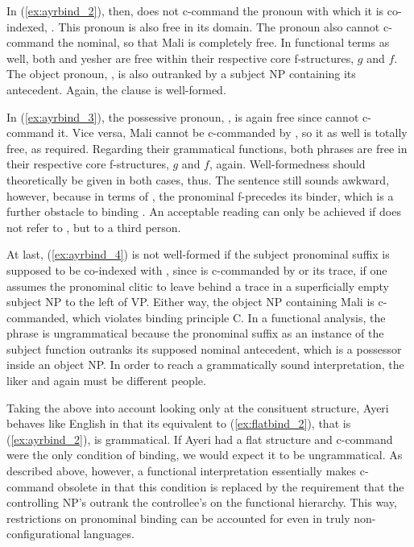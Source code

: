 In (\ref{ex:ayrbind_2}), then,  does not c-command the pronoun
with which it is co-indexed, . This pronoun is also free
in its domain. The pronoun also cannot c-command the nominal, so that
 {Mali} is completely free. In functional terms as well, both
 and  {yes}{her} are free within their respective
core f-structures, $g$ and $f$. The object pronoun, , is
also outranked by a subject NP containing its antecedent. Again, the clause is
well-formed.

In (\ref{ex:ayrbind_3}), the possessive pronoun, , is
again free since  cannot c-command it. Vice versa, 
{Mali} cannot be c-commanded by , so it as well is totally
free, as required. Regarding their grammatical functions, both phrases are free
in their respective core f-structures, $g$ and $f$, again. Well-formedness
should theoretically be given in both cases, thus. The sentence still sounds
awkward, however, because in terms of \Lfg{}, the pronominal f-precedes its
binder, which is a further obstacle to binding \citep[213]{bresnan2016}. An
acceptable reading can only be achieved if  does not refer
to , but to a third person.

At last, (\ref{ex:ayrbind_4}) is not well-formed if the subject pronominal
suffix  is supposed to be co-indexed with ,
since  is c-commanded by  or its
trace, if one assumes the pronominal clitic to leave behind a trace in a
superficially empty subject NP to the left of VP. Either way, the object NP
containing  {Mali} is c-commanded, which violates binding principle
C. In a functional analysis, the phrase is ungrammatical because the pronominal
suffix as an instance of the subject function outranks its supposed nominal
antecedent, which is a possessor inside an object NP. In order to reach a
grammatically sound interpretation, the liker and  again
must be different people.

Taking the above into account looking only at the consituent structure, Ayeri
behaves like English in that its equivalent to (\ref{ex:flatbind_2}), that is
(\ref{ex:ayrbind_2}), is grammatical. If Ayeri had a flat structure and
c-command were the only condition of binding, we would expect it to be
ungrammatical. As described above, however, a functional interpretation
essentially makes c-command obsolete in that this condition is replaced by the
requirement that the controlling NP's \GF{} outrank the controllee's on the
functional hierarchy. This way, restrictions on pronominal binding can be
accounted for even in truly non-configurational languages.

